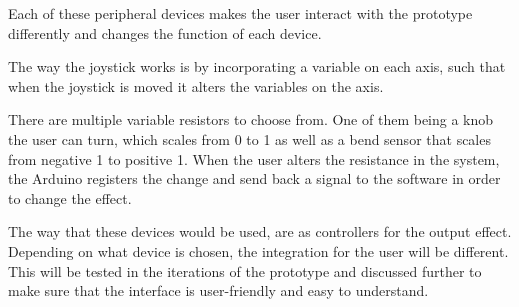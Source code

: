 
Each of these peripheral devices makes the user interact with the prototype differently and changes the function of each device. 

The way the joystick works is by incorporating a variable on each axis, such that when the joystick is moved it alters the variables on the axis. 

There are multiple variable resistors to choose from. One of them being a knob the user can turn, which scales from 0 to 1 as well as a bend sensor that scales from negative 1 to positive 1. When the user alters the resistance in the system, the Arduino registers the change and send back a signal to the software in order to change the effect.

The way that these devices would be used, are as controllers for the output effect. Depending on what device is chosen, the integration for the user will be different. This will be tested in the iterations of the prototype and discussed further to make sure that the interface is user-friendly and easy to understand. 

